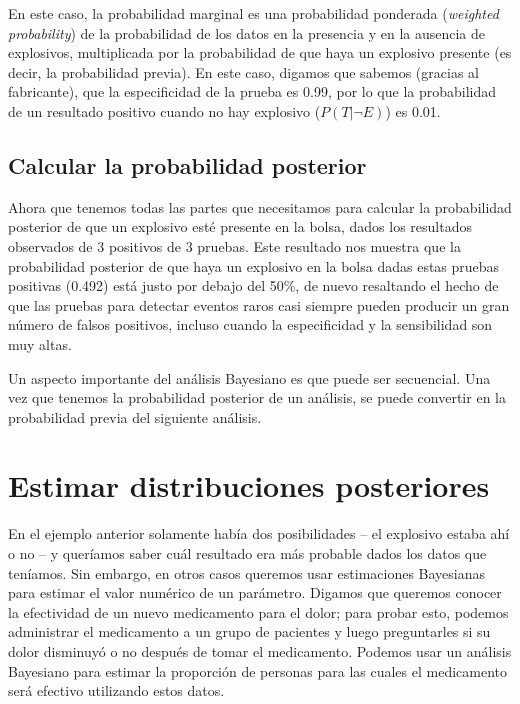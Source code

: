 \documentclass[
  12pt,
]{book}
\begin{document}
En este caso, la probabilidad marginal es una probabilidad ponderada (\emph{weighted probability}) de la probabilidad de los datos en la presencia y en la ausencia de explosivos, multiplicada por la probabilidad de que haya un explosivo presente (es decir, la probabilidad previa). En este caso, digamos que sabemos (gracias al fabricante), que la especificidad de la prueba es 0.99, por lo que la probabilidad de un resultado positivo cuando no hay explosivo (\(P(T|\neg E)\)) es 0.01.

\hypertarget{calcular-la-probabilidad-posterior}{%
\subsection{Calcular la probabilidad posterior}\label{calcular-la-probabilidad-posterior}}

Ahora que tenemos todas las partes que necesitamos para calcular la probabilidad posterior de que un explosivo esté presente en la bolsa, dados los resultados observados de 3 positivos de 3 pruebas.
Este resultado nos muestra que la probabilidad posterior de que haya un explosivo en la bolsa dadas estas pruebas positivas (0.492) está justo por debajo del 50\%, de nuevo resaltando el hecho de que las pruebas para detectar eventos raros casi siempre pueden producir un gran número de falsos positivos, incluso cuando la especificidad y la sensibilidad son muy altas.

Un aspecto importante del análisis Bayesiano es que puede ser secuencial. Una vez que tenemos la probabilidad posterior de un análisis, se puede convertir en la probabilidad previa del siguiente análisis.

\hypertarget{estimating-posterior-distributions}{%
\section{Estimar distribuciones posteriores}\label{estimating-posterior-distributions}}

En el ejemplo anterior solamente había dos posibilidades -- el explosivo estaba ahí o no -- y queríamos saber cuál resultado era más probable dados los datos que teníamos. Sin embargo, en otros casos queremos usar estimaciones Bayesianas para estimar el valor numérico de un parámetro. Digamos que queremos conocer la efectividad de un nuevo medicamento para el dolor; para probar esto, podemos administrar el medicamento a un grupo de pacientes y luego preguntarles si su dolor disminuyó o no después de tomar el medicamento. Podemos usar un análisis Bayesiano para estimar la proporción de personas para las cuales el medicamento será efectivo utilizando estos datos.
\end{document}

